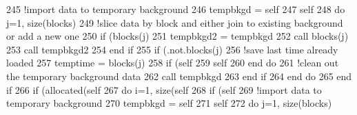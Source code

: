 \begin{DoxyCode}
245                     \textcolor{comment}{!import data to temporary background}
246                     tempbkgd = self%
247                     self%
248                     \textcolor{keywordflow}{do} j=1, \textcolor{keyword}{size}(blocks)
249                         \textcolor{comment}{!slice data by block and either join to existing background or add a new one       
                       }
250                         \textcolor{keywordflow}{if} (blocks(j)%
251                             tempbkgd2 = tempbkgd%
252                             \textcolor{keyword}{call }blocks(j)%
253                             \textcolor{keyword}{call }tempbkgd2%
254 \textcolor{keywordflow}{                        end if}
255                         \textcolor{keywordflow}{if} (.not.blocks(j)%
256                         \textcolor{comment}{!save last time already loaded}
257                         temptime = blocks(j)%
258                         \textcolor{keywordflow}{if} (self%
259                         self%
260 \textcolor{keywordflow}{                    end do}
261                     \textcolor{comment}{!clean out the temporary background data}
262                     \textcolor{keyword}{call }tempbkgd%
263 \textcolor{keywordflow}{                end if}
264 \textcolor{keywordflow}{            end do}
265 \textcolor{keywordflow}{        end if}
266         \textcolor{keywordflow}{if} (\textcolor{keyword}{allocated}(self%
267             \textcolor{keywordflow}{do} i=1, \textcolor{keyword}{size}(self%
268                 \textcolor{keywordflow}{if} (self%
269                     \textcolor{comment}{!import data to temporary background}
270                     tempbkgd = self%
271                     self%
272                     \textcolor{keywordflow}{do} j=1, \textcolor{keyword}{size}(blocks)

\end{DoxyCode}
